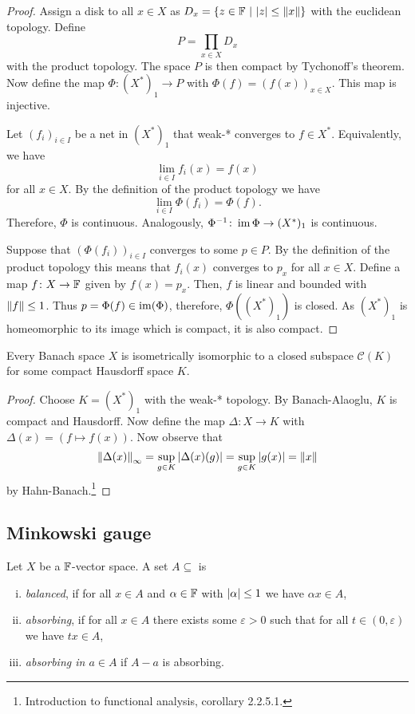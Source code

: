 \begin{proof}
Assign a disk to all $x \in X$ as
$D_x = \left\{z \in \mathbb{F}~\middle\vert~\left\lvert z\right\rvert \leq \left\lVert x\right\rVert\right\}$ with the euclidean
topology. Define
\[
P = \prod_{x \in X} D_x
\]
with the product topology. The space $P$ is then compact by
Tychonoff's theorem. Now define the map $\Phi \colon (X^*)_1 \to P$
with $\Phi(f) = (f(x))_{x \in X}$. This map is injective.

Let $(f_i)_{i \in I}$ be a net in $(X^*)_1$ that weak-* converges
to $f \in X^*$. Equivalently, we have
\[
\lim_{i \in I} f_i(x) = f(x)
\]
for all $x \in X$. By the definition of the product topology we
have
\[
\lim_{i \in I} \Phi(f_i) = \Phi(f).
\]
Therefore, $\Phi$ is continuous. Analogously,
$\Phi^{-1} \colon \operatorname{im} \Phi \to (X^*)_1$ is continuous.

Suppose that $(\Phi(f_i))_{i \in I}$ converges to some $p \in P$.
By the definition of the product topology this means that
$f_i(x)$ converges to $p_x$ for all $x \in X$. Define a map
$f \colon X \to \mathbb{F}$ given by $f(x) = p_x$. Then, $f$ is linear and
bounded with $\left\lVert f\right\rVert \leq 1$. Thus $p = \Phi(f) \in \operatorname{im}(\Phi)$,
therefore, $\Phi((X^*)_1)$ is closed. As $(X^*)_1$ is homeomorphic
to its image which is compact, it is also compact.
\end{proof}

\begin{posledica}
Every Banach space $X$ is isometrically isomorphic to a closed
subspace $\mathcal{C}(K)$ for some compact Hausdorff space $K$.
\end{posledica}

\begin{proof}
Choose $K = (X^*)_1$ with the weak-* topology. By Banach-Alaoglu,
$K$ is compact and Hausdorff. Now define the map
$\Delta \colon X \to K$ with $\Delta(x) = (f \mapsto f(x))$.
Now observe that
\[
\left\lVert \Delta(x)\right\rVert_\infty =
\sup_{g \in K} \left\lvert \Delta(x)(g)\right\rvert =
\sup_{g \in K} \left\lvert g(x)\right\rvert =
\left\lVert x\right\rVert
\]
by Hahn-Banach.\footnote{Introduction to functional analysis,
corollary 2.2.5.1.}
\end{proof}

\newpage

\subsection{Minkowski gauge}


\begin{definicija}
Let $X$ be a $\mathbb{F}$-vector space. A set $A \subseteq$ is

\begin{enumerate}[i)]
\item \emph{balanced}, if for all $x \in A$
and $\alpha \in \mathbb{F}$ with $\left\lvert \alpha\right\rvert \leq 1$ we have
$\alpha x \in A$,
\item \emph{absorbing}, if for all $x \in A$
there exists some $\varepsilon > 0$ such that for all
$t \in (0, \varepsilon)$ we have $tx \in A$,
\item \emph{absorbing in $a \in A$} if $A - a$ is absorbing.
\end{enumerate}
\end{definicija}

